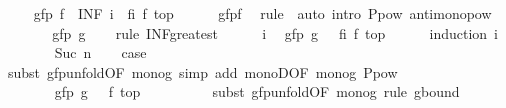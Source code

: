 \begin{isabellebody}
\isanewline
\ \ \isamarkupfalse%
\ {\isachardoublequoteopen}{\isasymalpha}\ {\isacharparenleft}gfp\ f{\isacharparenright}\ {\isacharequal}\ {\isacharparenleft}INF\ i{\isachardot}\ {\isasymalpha}\ {\isacharparenleft}{\isacharparenleft}f{\isacharcircum}{\isacharcircum}i{\isacharparenright}\ {\isacharparenleft}f\ top{\isacharparenright}{\isacharparenright}{\isacharparenright}{\isachardoublequoteclose}\isanewline
\ \ \ \ \isamarkupfalse%
\ gfp{\isacharunderscore}f\ \isamarkupfalse%
\ {\isacharparenleft}rule\ {\isasymalpha}{\isacharparenright}\ {\isacharparenleft}auto\ intro{\isacharbang}{\isacharcolon}\ P{\isacharunderscore}pow\ antimono{\isacharunderscore}pow{}{\isacharparenright}\isanewline
\ \ \isamarkupfalse%
\ \isamarkupfalse%
\ {\isachardoublequoteopen}{\isasymdots}\ {\isasymge}\ gfp\ g{\isachardoublequoteclose}\isanewline
\ \ \isamarkupfalse%
\ {\isacharparenleft}rule\ INF{\isacharunderscore}greatest{\isacharparenright}\isanewline
\ \ \ \ \isamarkupfalse%
\ i\ \isamarkupfalse%
\ {\isachardoublequoteopen}gfp\ g\ {\isasymle}\ {\isasymalpha}\ {\isacharparenleft}{\isacharparenleft}f{\isacharcircum}{\isacharcircum}i{\isacharparenright}\ {\isacharparenleft}f\ top{\isacharparenright}{\isacharparenright}{\isachardoublequoteclose}\isanewline
\ \ \ \ \isamarkupfalse%
\ {\isacharparenleft}induction\ i{\isacharparenright}\isanewline
\ \ \ \ \ \ \isamarkupfalse%
\ {\isacharparenleft}Suc\ n{\isacharparenright}\ \isamarkupfalse%
\ \isamarkupfalse%
\ {\isacharquery}case\isanewline
\ \ \ \ \ \ \ \ \isamarkupfalse%
\ {\isacharparenleft}subst\ gfp{\isacharunderscore}unfold{\isacharbrackleft}OF\ mono{\isacharunderscore}g{\isacharbrackright}{\isacharparenright}\ {\isacharparenleft}simp\ add{\isacharcolon}\ monoD{\isacharbrackleft}OF\ mono{\isacharunderscore}g{\isacharbrackright}\ P{\isacharunderscore}pow{\isacharparenright}\isanewline
\ \ \ \ \isamarkupfalse%
\isanewline
\ \ \ \ \ \ \isamarkupfalse%
\ {}\isanewline
\ \ \ \ \ \ \isamarkupfalse%
\ {\isachardoublequoteopen}gfp\ g\ {\isasymle}\ {\isasymalpha}\ {\isacharparenleft}f\ top{\isacharparenright}{\isachardoublequoteclose}\isanewline
\ \ \ \ \ \ \ \ \isamarkupfalse%
\ {\isacharparenleft}subst\ gfp{\isacharunderscore}unfold{\isacharbrackleft}OF\ mono{\isacharunderscore}g{\isacharbrackright}{\isacharparenright}\ {\isacharparenleft}rule\ g{\isacharunderscore}bound{\isacharparenright}\isanewline

\end{isabellebody}
